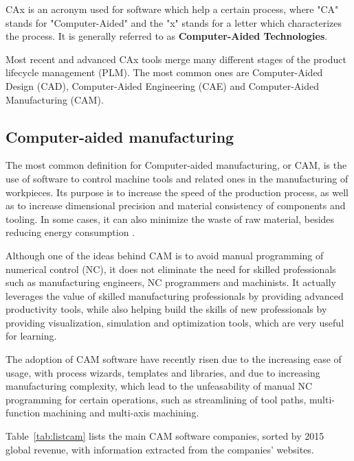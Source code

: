 	CAx is an acronym used for software which help a certain process, where "CA" stands for "Computer-Aided" and the "x" stands for a letter which characterizes the process. It is generally referred to as \textbf{Computer-Aided Technologies}.
	
	Most recent and advanced CAx tools merge many different stages of the product lifecycle management (PLM). The most common ones are Computer-Aided Design (CAD), Computer-Aided Engineering (CAE) and Computer-Aided Manufacturing (CAM).
	
	\subsection{Computer-aided manufacturing}
	
	The most common definition for Computer-aided manufacturing, or CAM, is the use of software to control machine tools and related ones in the manufacturing of workpieces. Its purpose is to increase the speed of the production process, as well as to increase dimensional precision and material consistency of components and tooling. In some cases, it can also minimize the waste of raw material, besides reducing energy consumption \cite{elanchezhian2007}.
	
	Although one of the ideas behind CAM is to avoid manual programming of numerical control (NC), it does not eliminate the need for skilled professionals such as manufacturing engineers, NC programmers and machinists. It actually leverages the value of skilled manufacturing professionals by providing advanced productivity tools, while also helping build the skills of new professionals by providing visualization, simulation and optimization tools, which are very useful for learning.
	
	The adoption of CAM software have recently risen due to the increasing ease of usage, with process wizards, templates and libraries, and due to increasing manufacturing complexity, which lead to the unfeasability of manual NC programming for certain operations, such as streamlining of tool paths, multi-function machining and multi-axis machining.
	
	Table~\ref{tab:listcam} lists the main CAM software companies, sorted by 2015 global revenue, with information extracted from the companies' websites.
	
